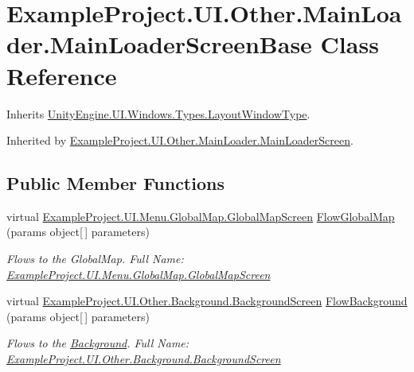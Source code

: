 \hypertarget{class_example_project_1_1_u_i_1_1_other_1_1_main_loader_1_1_main_loader_screen_base}{}\section{Example\+Project.\+U\+I.\+Other.\+Main\+Loader.\+Main\+Loader\+Screen\+Base Class Reference}
\label{class_example_project_1_1_u_i_1_1_other_1_1_main_loader_1_1_main_loader_screen_base}


Inherits \hyperlink{class_unity_engine_1_1_u_i_1_1_windows_1_1_types_1_1_layout_window_type}{Unity\+Engine.\+U\+I.\+Windows.\+Types.\+Layout\+Window\+Type}.



Inherited by \hyperlink{class_example_project_1_1_u_i_1_1_other_1_1_main_loader_1_1_main_loader_screen}{Example\+Project.\+U\+I.\+Other.\+Main\+Loader.\+Main\+Loader\+Screen}.

\subsection*{Public Member Functions}
\begin{DoxyCompactItemize}
\item 
virtual \hyperlink{class_example_project_1_1_u_i_1_1_menu_1_1_global_map_1_1_global_map_screen}{Example\+Project.\+U\+I.\+Menu.\+Global\+Map.\+Global\+Map\+Screen} \hyperlink{class_example_project_1_1_u_i_1_1_other_1_1_main_loader_1_1_main_loader_screen_base_a265a1d9c8c2c98c040bb8909b9c05d91}{Flow\+Global\+Map} (params object\mbox{[}$\,$\mbox{]} parameters)
\begin{DoxyCompactList}\small\item\em Flows to the Global\+Map. Full Name\+: \hyperlink{class_example_project_1_1_u_i_1_1_menu_1_1_global_map_1_1_global_map_screen}{Example\+Project.\+U\+I.\+Menu.\+Global\+Map.\+Global\+Map\+Screen} \end{DoxyCompactList}\item 
virtual \hyperlink{class_example_project_1_1_u_i_1_1_other_1_1_background_1_1_background_screen}{Example\+Project.\+U\+I.\+Other.\+Background.\+Background\+Screen} \hyperlink{class_example_project_1_1_u_i_1_1_other_1_1_main_loader_1_1_main_loader_screen_base_a0de444d663f6aaff30fff547b9dacec3}{Flow\+Background} (params object\mbox{[}$\,$\mbox{]} parameters)
\begin{DoxyCompactList}\small\item\em Flows to the \hyperlink{namespace_example_project_1_1_u_i_1_1_other_1_1_background}{Background}. Full Name\+: \hyperlink{class_example_project_1_1_u_i_1_1_other_1_1_background_1_1_background_screen}{Example\+Project.\+U\+I.\+Other.\+Background.\+Background\+Screen} \end{DoxyCompactList}\end{DoxyCompactItemize}
